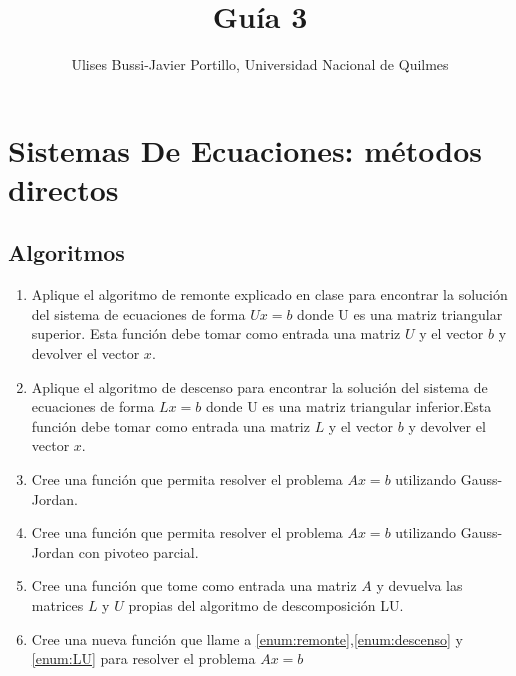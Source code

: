 \documentclass[a4paper,11pt]{article}
\makeatletter
\theoremstyle{mytheor}
\renewcommand{\maketitle}{
\colorbox{gray!20}{\framebox[\linewidth]{ \huge \textsc{\@title} } 
\lfoot{\@title}
}

}
\makeatother
\begin{document}
\title{Guía 3}

\author{Ulises Bussi-Javier Portillo, Universidad Nacional de Quilmes}


\maketitle \vspace{20pt}

\section*{Sistemas De Ecuaciones: métodos directos}
%

\subsection*{Algoritmos}

\begin{enumerate}[label=\Roman*]

\item \label{enum:remonte} Aplique el algoritmo de remonte explicado en clase para encontrar la solución del sistema de ecuaciones de forma $U x =b$ donde U es una matriz triangular superior. Esta función debe tomar como entrada una matriz $U$ y el vector $b$ y devolver el vector $x$.

\item \label{enum:descenso} Aplique el algoritmo de descenso para encontrar la solución del sistema de ecuaciones de forma $L x =b$ donde U es una matriz triangular inferior.Esta función debe tomar como entrada una matriz $L$ y el vector $b$ y devolver el vector $x$.



\item \label{enum:gaussJordan} Cree una función que permita resolver el problema $A x=b$ utilizando Gauss-Jordan.

\item \label{enum:pivot} Cree una función que permita resolver el problema $A x=b$ utilizando Gauss-Jordan con pivoteo parcial.


\item \label{enum:LU} Cree una función que tome como entrada una matriz $A$ y devuelva las matrices $L$ y $U$ propias del algoritmo de descomposición LU.


\item \label{enum:errStop} Cree una nueva función que llame a \ref{enum:remonte},\ref{enum:descenso} y \ref{enum:LU} para resolver el problema $A x=b$


\end{enumerate}
\end{document}
